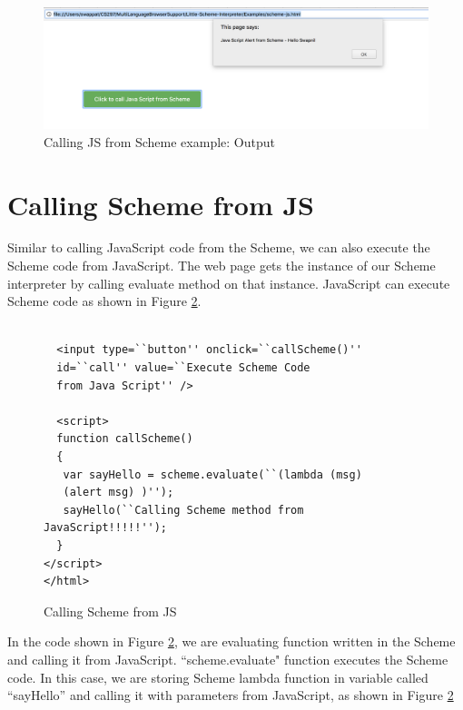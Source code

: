 \begin{figure}[H]
	\begin{center}
		\includegraphics[width=\linewidth]{./images/scheme-js-interaction.png}
	\end{center}
	\caption{Calling JS from Scheme example: Output}
	\label{fig:scheme-js-interaction}
\end{figure}


\section{Calling Scheme from JS}

Similar to calling JavaScript code from the Scheme, we can also execute the Scheme code from JavaScript. The web page gets the instance of our Scheme interpreter by calling evaluate method on that instance. JavaScript can execute Scheme code as shown in Figure \ref{fig:js-scheme-interaction}. 


\begin{figure}[H]
	\begin{lstlisting}
	
  <input type=``button'' onclick=``callScheme()'' 
  id=``call'' value=``Execute Scheme Code 
  from Java Script'' />

  <script>
  function callScheme()
  {
   var sayHello = scheme.evaluate(``(lambda (msg)  
   (alert msg) )'');
   sayHello(``Calling Scheme method from JavaScript!!!!!'');
  }
</script>
</html>
	\end{lstlisting}
	\caption{Calling Scheme from JS}
	\label{fig:js-scheme-interaction}
\end{figure}



In the code shown in Figure \ref{fig:js-scheme-interaction}, we are evaluating function written in the Scheme and calling it from JavaScript. ``scheme.evaluate" function executes the Scheme code. In this case, we are storing Scheme lambda function in variable called ``sayHello'' and calling it with parameters from JavaScript, as shown in Figure \ref{fig:js-scheme-interaction}


